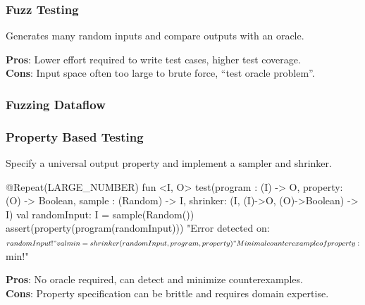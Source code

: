 \documentclass{beamer}
\begin{document}
\begin{frame}[fragile]
\frametitle{Fuzz Testing}
Generates many random inputs and compare outputs with an oracle.
\textbf{Pros}: Lower effort required to write test cases, higher test coverage. \\
\textbf{Cons}: Input space often too large to brute force, ``test oracle problem''.
\end{frame}
\begin{frame}[fragile]
\frametitle{Fuzzing Dataflow}
\vspace{-0.2}
\center{}
\end{frame}


\begin{frame}[fragile]
\frametitle{Property Based Testing}
Specify a universal output property and implement a sampler and shrinker.
\begin{kotlinlisting}
@Repeat(LARGE_NUMBER)
fun <I, O> test(program : (I) -> O,
                property: (O) -> Boolean,
                sample  : (Random) -> I,
                shrinker: (I, (I)->O, (O)->Boolean) -> I) {
    val randomInput: I = sample(Random())
    assert(property(program(randomInput))) {
      "Error detected on: $randomInput!"
      val min = shrinker(randomInput, program, property)
      "Minimal counterexample of property: $min!"
    }
  }
\end{kotlinlisting}
\textbf{Pros}: No oracle required, can detect and minimize counterexamples. \\
\textbf{Cons}: Property specification can be brittle and requires domain expertise.
\end{frame}
\end{document}
